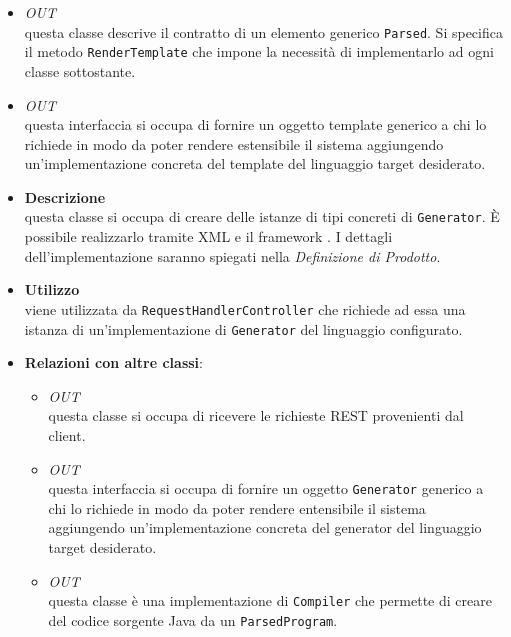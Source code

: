 \begin{itemize}
\begin{itemize}
\item \textit{OUT} \hyperref[\nogloxy{swedesigner::server::project::ParsedElement}]{}\\
questa classe descrive il contratto di un elemento generico \texttt{Parsed}. Si specifica il metodo \texttt{RenderTemplate} che impone la necessità di implementarlo ad ogni classe sottostante.
\item \textit{OUT} \hyperref[\nogloxy{swedesigner::server::template::Template}]{}\\
questa interfaccia si occupa di fornire un oggetto template generico a chi lo richiede in modo da poter rendere estensibile il sistema aggiungendo un'implementazione concreta del template del linguaggio target desiderato.
\end{itemize}
\end{itemize}

\label{\nogloxy{swedesigner::server::generator::GeneratorAssembler}}
\begin{itemize}
\item \textbf{Descrizione}\\
questa classe si occupa di creare delle istanze di tipi concreti di \texttt{Generator}. È possibile realizzarlo tramite XML e il framework \spring. I dettagli dell'implementazione saranno spiegati nella \emph{Definizione di Prodotto}. %
\item \textbf{Utilizzo}\\
viene utilizzata da \texttt{RequestHandlerController} che richiede ad essa una istanza di un'implementazione di \texttt{Generator} del linguaggio configurato.
\item \textbf{Relazioni con altre classi}:
\begin{itemize}
\item \textit{OUT} \hyperref[\nogloxy{swedesigner::server::controller::RequestHandlerController}]{}\\
questa classe si occupa di ricevere le richieste REST provenienti dal client.
\item \textit{OUT} \hyperref[\nogloxy{swedesigner::server::generator::Generator}]{}\\
questa interfaccia si occupa di fornire un oggetto \texttt{Generator} generico a chi lo richiede in modo da poter rendere entensibile il sistema aggiungendo un'implementazione concreta del generator del linguaggio target desiderato.
\item \textit{OUT} \hyperref[\nogloxy{swedesigner::server::generator::java::JavaGenerator}]{}\\
questa classe è una implementazione di \texttt{Compiler} che permette di creare del codice sorgente Java da un \texttt{ParsedProgram}.
\end{itemize}
\end{itemize}
